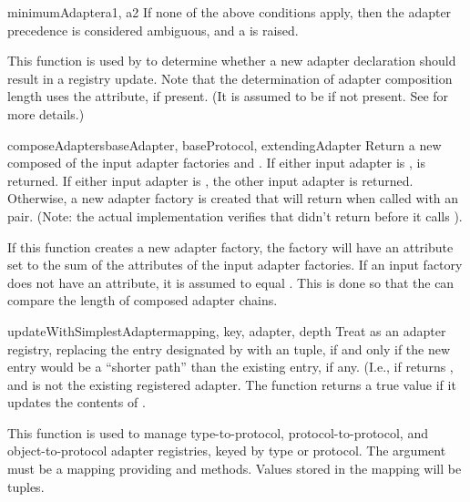 \begin{verbatim%
}
\begin{verbatim%
}
\begin{verbatim%
}
\begin{verbatim%
}
\begin{verbatim%
}
\begin{verbatim%
}
\begin{funcdesc}{minimumAdapter}{a1, a2 }
If none of the above conditions apply, then the adapter precedence is
considered ambiguous, and a  is raised.

This function is used by  to determine
whether a new adapter declaration should result in a registry update.  Note
that the determination of adapter composition length uses the
 attribute, if present.  (It is assumed to be
 if not present.  See  for more
details.)
\end{funcdesc}


\begin{funcdesc}{composeAdapters}{baseAdapter, baseProtocol, extendingAdapter}
Return a new  composed of the input adapter factories
 and .  If either input adapter is
,  is returned.  If
either input adapter is , the other input adapter
is returned.  Otherwise, a new adapter factory is created that will return
when called with an  pair.  (Note: the actual
implementation verifies that  didn't return 
before it calls ).

If this function creates a new adapter factory, the factory will have an
 attribute set to the sum of the
 attributes of the input adapter factories.  If an
input factory does not have an  attribute, it is
assumed to equal .  This is done so that the
 can compare the length of composed adapter chains.
\end{funcdesc}


\begin{funcdesc}{updateWithSimplestAdapter}{mapping, key, adapter, depth}
Treat  as an adapter registry, replacing the entry designated by
 with an  tuple, if and only if
the new entry would be a ``shorter path'' than the existing entry, if any.
(I.e., if 
returns , and  is not the existing registered
adapter.  The function returns a true value if it updates the contents of
.

This function is used to manage type-to-protocol, protocol-to-protocol, and
object-to-protocol adapter registries, keyed by type or protocol.  The
 argument must be a mapping providing 
and  methods.  Values stored in the mapping will be
 tuples.
\end{funcdesc}






\end{verbatim%
}
\end{verbatim%
}
\end{verbatim%
}
\end{verbatim%
}
\end{verbatim%
}
\end{verbatim%
}
